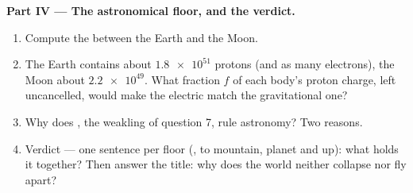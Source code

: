 \begin{problem}
\medskip
\noindent\textbf{Part IV --- The astronomical floor, and the verdict.}
\begin{enumerate}[resume]
  \item Compute the  between the Earth and the Moon.
  \item The Earth contains about $\num{1.8e51}$ protons (and as many
        electrons), the Moon about $\num{2.2e49}$. What fraction $f$ of
        each body's proton charge, left uncancelled, would make the
        electric  match the gravitational one?
  \item Why does , the weakling of question 7, rule
        astronomy? Two reasons.
  \item Verdict --- one sentence per floor (,  to mountain,
        planet and up): what holds it together? Then answer the title:
        why does the world neither collapse nor fly apart?
\end{enumerate}
\end{problem}
